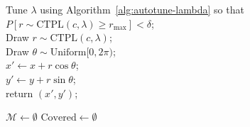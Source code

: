 \documentclass[
  11pt,
  letterpaper]{siamart251216}
\begin{document}
\begin{algorithm2e}[H]
\caption{Perturb 2D Vertex by \ac{CTPL} Noise}
\label{alg:samplelevy2d}
Tune $\lambda$ using Algorithm~\ref{alg:autotune-lambda} so that $P[r \sim \mathrm{CTPL}(c, \lambda) \geq r_{\max}] < \delta$;\\
Draw $r \sim \mathrm{CTPL}(c, \lambda)$;\\
Draw $\theta \sim \mathrm{Uniform}[0, 2\pi)$;\\
$x' \leftarrow x + r \cos \theta$;\\
$y' \leftarrow y + r \sin \theta$;\\
return $(x', y')$;
\end{algorithm2e}

\begin{algorithm2e}[H]
    \caption{Motif-Extractor: Greedy selection of disjoint fragile motifs. Motifs are sorted by Table~\ref{tbl-degree-summary}: process largest $C_d$}
    \label{alg:motif_extractor}


    \BlankLine

    $\mathcal{M} \gets \emptyset$\;
    $\text{Covered} \gets \emptyset$\;

    \;
\end{algorithm2e}
\end{document}
